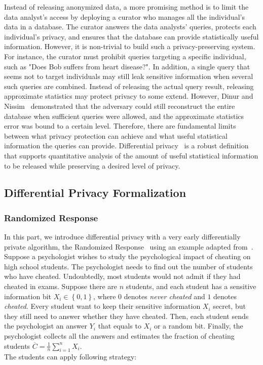 Instead of releasing anonymized data, a more promising method is to limit the data analyst's access by deploying a curator who manages all the individual's data in a database. The curator answers the data analysts' queries, protects each individual's privacy, and ensures that the database can provide statistically useful information. However, it is non-trivial to build such a privacy-preserving system. For instance, the curator must prohibit queries targeting a specific individual, such as "Does Bob suffers from heart disease?". In addition, a single query that seems not to target individuals may still leak sensitive information when several such queries are combined. Instead of releasing the actual query result, releasing approximate statistics may protect privacy to some extend. However, Dinur and Nissim~\cite{dinur2003revealing} demonstrated that the adversary could still reconstruct the entire database when sufficient queries were allowed, and the approximate statistics error was bound to a certain level. Therefore, there are fundamental limits between what privacy protection can achieve and what useful statistical information the queries can provide.
Differential privacy~\cite{dwork2006differential, dwork2006calibrating} is a robust definition that supports quantitative analysis of the amount of useful statistical information to be released while preserving a desired level of privacy.


\subsection{Differential Privacy Formalization}

\subsubsection{Randomized Response}
\label{subsubsection:randomizedresponse}
In this part, we introduce differential privacy with a very early differentially private algorithm, the Randomized Response~\cite{warner1965randomized} using an example adapted from~\cite{KamathLec3AlgorithmsrivateDataAnalysis}.
Suppose a psychologist wishes to study the psychological impact of cheating on high school students. The psychologist needs to find out the number of students who have cheated. Undoubtedly, most students would not admit if they had cheated in exams. Suppose there are $n$ students, and each student has a sensitive information bit $X_{i}\in \left\{ 0,1\right\} $, where $0$ denotes \textit{never cheated} and $1$ denotes \textit{cheated}. Every student want to keep their sensitive information $X_{i}$ secret, but they still need to answer whether they have cheated. Then, each student sends the psychologist an answer $Y_{i}$ that equals to $X_{i}$ or a random bit. Finally, the psychologist collects all the answers and estimates the fraction of cheating students $\overline{C}=\frac{1}{n}\sum ^{n}_{i=1}X_{i}$. \\
The students can apply following strategy:

